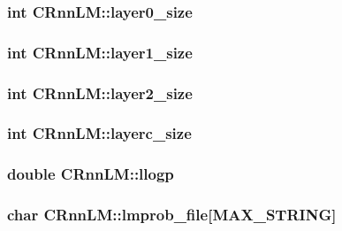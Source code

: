 \subsubsection[{layer0\+\_\+size}]{\setlength{\rightskip}{0pt plus 5cm}int C\+Rnn\+L\+M\+::layer0\+\_\+size}\hypertarget{class_c_rnn_l_m_aeae97861a56a3d5d0763b7720e240c4e}{}\label{class_c_rnn_l_m_aeae97861a56a3d5d0763b7720e240c4e}
\subsubsection[{layer1\+\_\+size}]{\setlength{\rightskip}{0pt plus 5cm}int C\+Rnn\+L\+M\+::layer1\+\_\+size}\hypertarget{class_c_rnn_l_m_abf9e24eedfee0a03c8ed4074ab228bec}{}\label{class_c_rnn_l_m_abf9e24eedfee0a03c8ed4074ab228bec}
\subsubsection[{layer2\+\_\+size}]{\setlength{\rightskip}{0pt plus 5cm}int C\+Rnn\+L\+M\+::layer2\+\_\+size}\hypertarget{class_c_rnn_l_m_a4bcaff629c67692034170ed83e803e0d}{}\label{class_c_rnn_l_m_a4bcaff629c67692034170ed83e803e0d}
\subsubsection[{layerc\+\_\+size}]{\setlength{\rightskip}{0pt plus 5cm}int C\+Rnn\+L\+M\+::layerc\+\_\+size}\hypertarget{class_c_rnn_l_m_a8ccec822d7069defa83267ff73bfbbe2}{}\label{class_c_rnn_l_m_a8ccec822d7069defa83267ff73bfbbe2}
\subsubsection[{llogp}]{\setlength{\rightskip}{0pt plus 5cm}double C\+Rnn\+L\+M\+::llogp}\hypertarget{class_c_rnn_l_m_addb6080ed0f377e9bfef0ad0f526370d}{}\label{class_c_rnn_l_m_addb6080ed0f377e9bfef0ad0f526370d}
\subsubsection[{lmprob\+\_\+file}]{\setlength{\rightskip}{0pt plus 5cm}char C\+Rnn\+L\+M\+::lmprob\+\_\+file\mbox{[}{\bf M\+A\+X\+\_\+\+S\+T\+R\+I\+NG}\mbox{]}}\hypertarget{class_c_rnn_l_m_a1effb774075f3f4e0e6b3c0bda6fd330}{}\label{class_c_rnn_l_m_a1effb774075f3f4e0e6b3c0bda6fd330}
